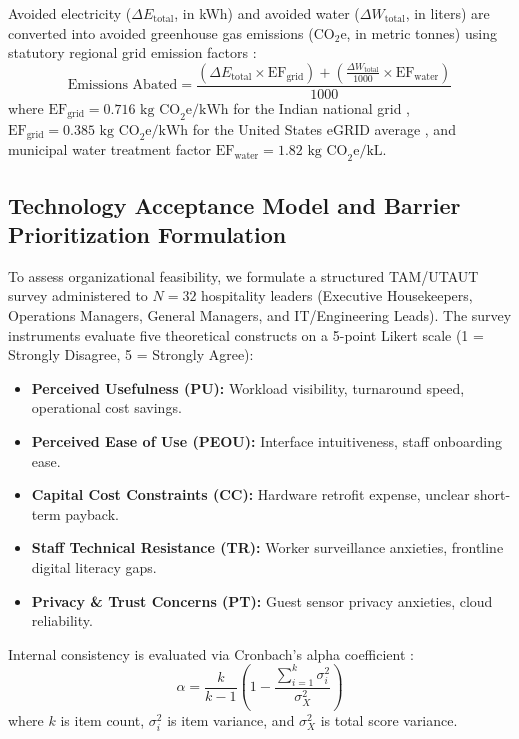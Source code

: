 \documentclass[11pt,a4paper]{article}
\begin{document}
Avoided electricity ($\Delta E_{\text{total}}$, in kWh) and avoided water ($\Delta W_{\text{total}}$, in liters) are converted into avoided greenhouse gas emissions ($\text{CO}_2\text{e}$, in metric tonnes) using statutory regional grid emission factors \cite{cea2024,epa2024}:
\begin{equation}
\text{Emissions Abated} = \frac{(\Delta E_{\text{total}} \times \text{EF}_{\text{grid}}) + (\frac{\Delta W_{\text{total}}}{1000} \times \text{EF}_{\text{water}})}{1000}
\end{equation}
where $\text{EF}_{\text{grid}} = 0.716 \text{ kg CO}_2\text{e}/\text{kWh}$ for the Indian national grid \cite{cea2024}, $\text{EF}_{\text{grid}} = 0.385 \text{ kg CO}_2\text{e}/\text{kWh}$ for the United States eGRID average \cite{epa2024}, and municipal water treatment factor $\text{EF}_{\text{water}} = 1.82 \text{ kg CO}_2\text{e}/\text{kL}$.

\subsection{Technology Acceptance Model and Barrier Prioritization Formulation}
To assess organizational feasibility, we formulate a structured TAM/UTAUT survey \cite{davis1989,venkatesh2003} administered to $N=32$ hospitality leaders (Executive Housekeepers, Operations Managers, General Managers, and IT/Engineering Leads). The survey instruments evaluate five theoretical constructs on a 5-point Likert scale (1 = Strongly Disagree, 5 = Strongly Agree):
\begin{itemize}
    \item \textbf{Perceived Usefulness (PU):} Workload visibility, turnaround speed, operational cost savings.
    \item \textbf{Perceived Ease of Use (PEOU):} Interface intuitiveness, staff onboarding ease.
    \item \textbf{Capital Cost Constraints (CC):} Hardware retrofit expense, unclear short-term payback.
    \item \textbf{Staff Technical Resistance (TR):} Worker surveillance anxieties, frontline digital literacy gaps.
    \item \textbf{Privacy \& Trust Concerns (PT):} Guest sensor privacy anxieties, cloud reliability.
\end{itemize}

Internal consistency is evaluated via Cronbach's alpha coefficient \cite{cronbach1951}:
\begin{equation}
\alpha = \frac{k}{k - 1} \left( 1 - \frac{\sum_{i=1}^k \sigma_i^2}{\sigma_X^2} \right)
\end{equation}
where $k$ is item count, $\sigma_i^2$ is item variance, and $\sigma_X^2$ is total score variance.
\end{document}
